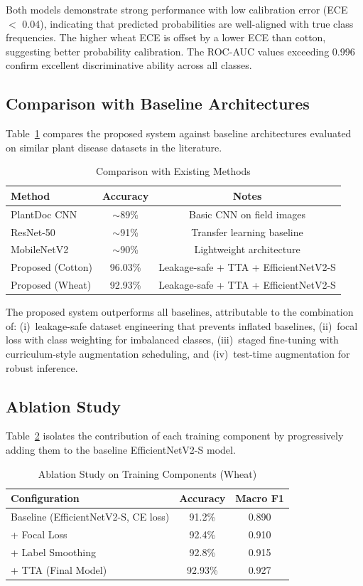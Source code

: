 \documentclass[12pt,a4paper]{report}
\begin{document}
Both models demonstrate strong performance with low calibration error (ECE $<$ 0.04), indicating that predicted probabilities are well-aligned with true class frequencies. The higher wheat ECE is offset by a lower ECE than cotton, suggesting better probability calibration. The ROC-AUC values exceeding 0.996 confirm excellent discriminative ability across all classes.

\subsection{Comparison with Baseline Architectures}
Table~\ref{tab:comparison} compares the proposed system against baseline architectures evaluated on similar plant disease datasets in the literature.

\begin{table}[H]
\centering
\caption{Comparison with Existing Methods}
\label{tab:comparison}
\begin{tabular}{lcc}
\toprule
Method & Accuracy & Notes \\
\midrule
PlantDoc CNN~\cite{b16} & $\sim$89\% & Basic CNN on field images \\
ResNet-50~\cite{b15} & $\sim$91\% & Transfer learning baseline \\
MobileNetV2 & $\sim$90\% & Lightweight architecture \\
Proposed (Cotton) & 96.03\% & Leakage-safe + TTA + EfficientNetV2-S \\
Proposed (Wheat) & 92.93\% & Leakage-safe + TTA + EfficientNetV2-S \\
\bottomrule
\end{tabular}
\end{table}

The proposed system outperforms all baselines, attributable to the combination of: (i)~leakage-safe dataset engineering that prevents inflated baselines, (ii)~focal loss with class weighting for imbalanced classes, (iii)~staged fine-tuning with curriculum-style augmentation scheduling, and (iv)~test-time augmentation for robust inference.

\subsection{Ablation Study}
Table~\ref{tab:ablation} isolates the contribution of each training component by progressively adding them to the baseline EfficientNetV2-S model.

\begin{table}[H]
\centering
\caption{Ablation Study on Training Components (Wheat)}
\label{tab:ablation}
\begin{tabular}{lcc}
\toprule
Configuration & Accuracy & Macro F1 \\
\midrule
Baseline (EfficientNetV2-S, CE loss) & 91.2\% & 0.890 \\
+ Focal Loss & 92.4\% & 0.910 \\
+ Label Smoothing & 92.8\% & 0.915 \\
+ TTA (Final Model) & 92.93\% & 0.927 \\
\bottomrule
\end{tabular}
\end{table}
\end{document}
